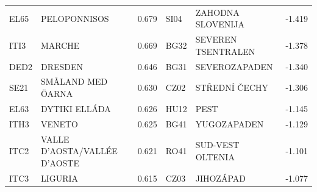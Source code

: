 \documentclass[a4paper,11pt,oneside]{article}
\begin{document}
\begin{table}
\begin{tabular}{llllll}
EL65 & PELOPONNISOS                        & 0.679 & SI04 & ZAHODNA SLOVENIJA                   & -1.419 \\
ITI3 & MARCHE                              & 0.669 & BG32 & SEVEREN TSENTRALEN                  & -1.378 \\
DED2 & DRESDEN                             & 0.646 & BG31 & SEVEROZAPADEN                       & -1.340 \\
SE21 & SMÅLAND MED ÖARNA                   & 0.630 & CZ02 & STŘEDNÍ ČECHY                       & -1.306 \\
EL63 & DYTIKI ELLÁDA                       & 0.626 & HU12 & PEST                                & -1.145 \\
ITH3 & VENETO                              & 0.625 & BG41 & YUGOZAPADEN                         & -1.129 \\
ITC2 & VALLE D’AOSTA/VALLÉE D’AOSTE        & 0.621 & RO41 & SUD-VEST OLTENIA                    & -1.101 \\
ITC3 & LIGURIA                             & 0.615 & CZ03 & JIHOZÁPAD                           & -1.077 \\
\bottomrule
\end{tabular}
\end{table}





\pagebreak

\clearpage






















\end{document}

